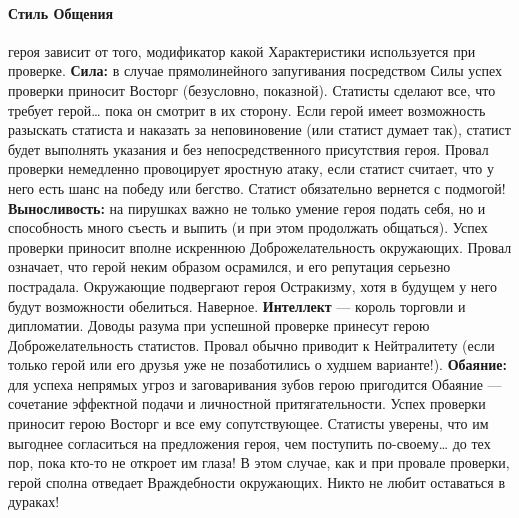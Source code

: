 \paragraph{Стиль Общения} героя зависит от того, модификатор какой Характеристики используется при проверке.
\newline \textbf{Сила:} в случае прямолинейного запугивания посредством Силы успех проверки приносит Восторг (безусловно, показной). Статисты сделают все, что требует герой… пока он смотрит в их сторону. Если герой имеет возможность разыскать статиста и наказать за неповиновение (или статист думает так), статист будет выполнять указания и без непосредственного присутствия героя. Провал проверки немедленно провоцирует яростную атаку, если статист считает, что у него есть шанс на победу или бегство. Статист обязательно вернется с подмогой!
\newline \textbf{Выносливость:} на пирушках важно не только умение героя подать себя, но и способность много съесть и выпить (и при этом продолжать общаться). Успех проверки приносит вполне искреннюю Доброжелательность окружающих. Провал означает, что герой неким образом осрамился, и его репутация серьезно пострадала. Окружающие подвергают героя Остракизму, хотя в будущем у него будут возможности обелиться. Наверное.
\newline \textbf{Интеллект} — король торговли и дипломатии. Доводы разума при успешной проверке принесут герою Доброжелательность статистов. Провал обычно приводит к Нейтралитету (если только герой или его друзья уже не позаботились о худшем варианте!).
\newline \textbf{Обаяние:} для успеха непрямых угроз и заговаривания зубов герою пригодится Обаяние — сочетание эффектной подачи и личностной притягательности. Успех проверки приносит герою Восторг и все ему сопутствующее. Статисты уверены, что им выгоднее согласиться на предложения героя, чем поступить по-своему… до тех пор, пока кто-то не откроет им глаза! В этом случае, как и при провале проверки, герой сполна отведает Враждебности окружающих. Никто не любит оставаться в дураках!

